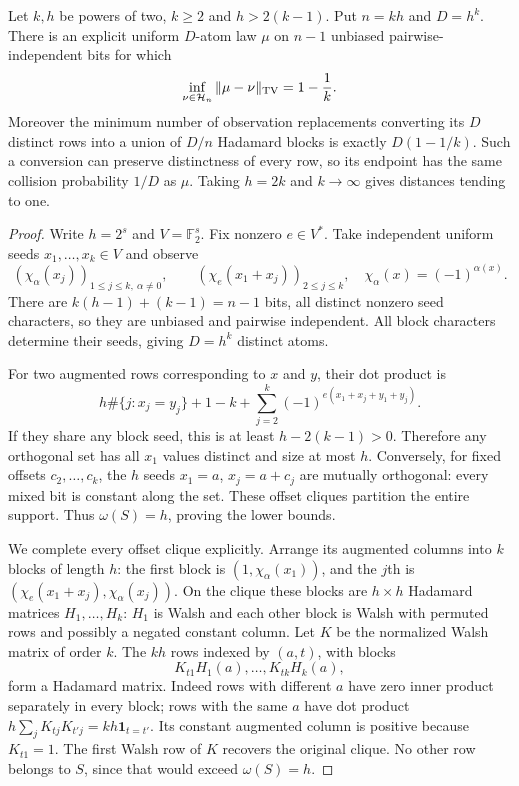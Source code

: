 \begin{theorem}
\label{thm:design-sharp-distance}
Let $k,h$ be powers of two, $k\ge2$ and $h>2(k-1)$. Put
$n=kh$ and $D=h^k$. There is an explicit uniform $D$-atom law $\mu$
on $n-1$ unbiased pairwise-independent bits for which
\[
 \inf_{\nu\in\mathcal H_n}\|\mu-\nu\|_{\rm TV}=1-\frac1k.
\]
Moreover the minimum number of observation replacements converting
its $D$ distinct rows into a union of $D/n$ Hadamard blocks is exactly
$D(1-1/k)$. Such a conversion can preserve distinctness of every row,
so its endpoint has the same collision probability $1/D$ as $\mu$.
Taking $h=2k$ and $k\to\infty$ gives distances tending to one.
\end{theorem}
\begin{proof}
Write $h=2^s$ and $V=\mathbb F_2^s$. Fix nonzero $e\in V^*$.
Take independent uniform seeds $x_1,\ldots,x_k\in V$ and observe
\[
 (\chi_\alpha(x_j))_{1\le j\le k,\ \alpha\ne0},\qquad
 (\chi_e(x_1+x_j))_{2\le j\le k},
 \quad\chi_\alpha(x)=(-1)^{\alpha(x)}.
\]
There are $k(h-1)+(k-1)=n-1$ bits, all distinct nonzero seed
characters, so they are unbiased and pairwise independent. All block
characters determine their seeds, giving $D=h^k$ distinct atoms.

For two augmented rows corresponding to $x$ and $y$, their dot product is
\[
 h\#\{j:x_j=y_j\}+1-k+
 \sum_{j=2}^k(-1)^{e(x_1+x_j+y_1+y_j)}.
\]
If they share any block seed, this is at least $h-2(k-1)>0$.
Therefore any orthogonal set has all $x_1$ values distinct and size
at most $h$. Conversely, for fixed offsets $c_2,\ldots,c_k$, the $h$
seeds $x_1=a$, $x_j=a+c_j$ are mutually orthogonal: every mixed bit
is constant along the set. These offset cliques partition the entire
support. Thus $\omega(S)=h$, proving the lower bounds.

We complete every offset clique explicitly. Arrange its augmented
columns into $k$ blocks of length $h$: the first block is
$(1,\chi_\alpha(x_1))$, and the $j$th is
$(\chi_e(x_1+x_j),\chi_\alpha(x_j))$. On the clique these blocks
are $h\times h$ Hadamard matrices $H_1,\ldots,H_k$:
$H_1$ is Walsh and each other block is Walsh with permuted rows and
possibly a negated constant column. Let $K$ be the normalized Walsh
matrix of order $k$. The $kh$ rows indexed by $(a,t)$, with blocks
\[
 K_{t1}H_1(a),\ldots,K_{tk}H_k(a),
\]
form a Hadamard matrix. Indeed rows with different $a$ have zero inner
product separately in every block; rows with the same $a$ have dot
product $h\sum_jK_{tj}K_{t'j}=kh\mathbf1_{t=t'}$.
Its constant augmented column is positive because $K_{t1}=1$.
The first Walsh row of $K$ recovers the original clique. No other row
belongs to $S$, since that would exceed $\omega(S)=h$.


\end{proof}
